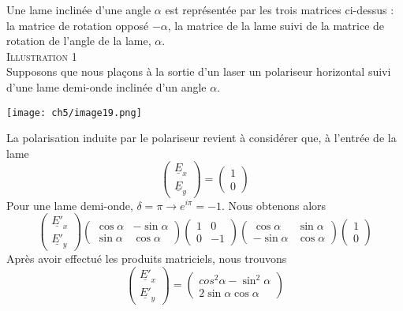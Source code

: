 		Une lame inclinée d'une angle $\alpha$ est représentée par les trois matrices ci-dessus : 
		la matrice de rotation opposé $-\alpha$, la matrice de la lame suivi de la matrice de rotation de 
		l'angle de la lame, $\alpha$.\\
		
		\textsc{Illustration 1}\ \\
		Supposons que nous plaçons à la sortie d'un laser un polariseur horizontal suivi d'une 
		lame demi-onde inclinée d'un angle $\alpha$. 
		\begin{center}
	\texttt{[image: ch5/image19.png]}
\end{center}			
		La polarisation induite par le polariseur 
		revient à considérer que, à l'entrée de la lame
		\begin{equation}
		\left(\begin{array}{c}
		\underline{E}_x\\
		\underline{E}_y
		\end{array}\right) = \left(\begin{array}{c}
		1\\
		0
		\end{array}\right)
		\end{equation}
		Pour une lame demi-onde, $\delta =\pi \rightarrow e^{i\pi} = -1$. Nous obtenons alors
		\begin{equation}
				\left(\begin{array}{c}
		\underline{E'}_x\\
		\underline{E'}_y
		\end{array}\right)\left(\begin{array}{cc}
	\cos\alpha & -\sin\alpha\\
	\sin\alpha & \cos\alpha
	\end{array}\right)
	\left(\begin{array}{cc}
	1 & 0\\
	0 & -1
	\end{array}\right)\left(\begin{array}{cc}
	\cos\alpha & \sin\alpha\\
	-\sin\alpha & \cos\alpha
	\end{array}\right)		\left(\begin{array}{c}
		1\\
		0
		\end{array}\right)
		\end{equation}
		Après avoir effectué les produits matriciels, nous trouvons
		\begin{equation}
		\left(\begin{array}{c}
		\underline{E'}_x\\
		\underline{E'}_y
		\end{array}\right) = \left(\begin{array}{cc}
		cos^2\alpha - \sin^2\alpha\\
		2\sin\alpha\cos\alpha
		\end{array}\right)
		\end{equation}

